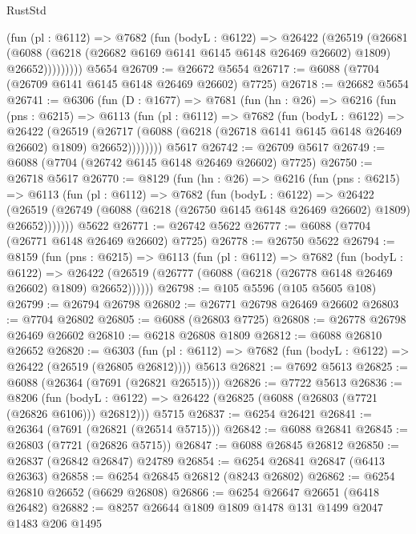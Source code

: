 \begin{lexlean}{RustStd}
\begin{coremodule}
            (fun (pl : @6112) =>
            @7682
              (fun (bodyL : @6122) =>
              @26422
                (@26519
                  (@26681
                    (@6088
                      (@6218 (@26682 @6169 @6141 @6145 @6148 @26469 @26602) @1809)
                      @26652)))))))))
    @5654
@26709 := @26672 @5654
@26717 := @6088 (@7704 (@26709 @6141 @6145 @6148 @26469 @26602) @7725)
@26718 := @26682 @5654
@26741 := @6306
    (fun (D : @1677) =>
    @7681
      (fun (hn : @26) =>
      @6216
        (fun (pns : @6215) =>
        @6113
          (fun (pl : @6112) =>
          @7682
            (fun (bodyL : @6122) =>
            @26422
              (@26519
                (@26717 (@6088 (@6218 (@26718 @6141 @6145 @6148 @26469 @26602) @1809) @26652))))))))
    @5617
@26742 := @26709 @5617
@26749 := @6088 (@7704 (@26742 @6145 @6148 @26469 @26602) @7725)
@26750 := @26718 @5617
@26770 := @8129
    (fun (hn : @26) =>
    @6216
      (fun (pns : @6215) =>
      @6113
        (fun (pl : @6112) =>
        @7682
          (fun (bodyL : @6122) =>
          @26422
            (@26519 (@26749 (@6088 (@6218 (@26750 @6145 @6148 @26469 @26602) @1809) @26652)))))))
    @5622
@26771 := @26742 @5622
@26777 := @6088 (@7704 (@26771 @6148 @26469 @26602) @7725)
@26778 := @26750 @5622
@26794 := @8159
    (fun (pns : @6215) =>
    @6113
      (fun (pl : @6112) =>
      @7682
        (fun (bodyL : @6122) =>
        @26422 (@26519 (@26777 (@6088 (@6218 (@26778 @6148 @26469 @26602) @1809) @26652))))))
@26798 := @105 @5596 (@105 @5605 @108)
@26799 := @26794 @26798
@26802 := @26771 @26798 @26469 @26602
@26803 := @7704 @26802
@26805 := @6088 (@26803 @7725)
@26808 := @26778 @26798 @26469 @26602
@26810 := @6218 @26808 @1809
@26812 := @6088 @26810 @26652
@26820 := @6303
    (fun (pl : @6112) => @7682 (fun (bodyL : @6122) => @26422 (@26519 (@26805 @26812))))
    @5613
@26821 := @7692 @5613
@26825 := @6088 (@26364 (@7691 (@26821 @26515)))
@26826 := @7722 @5613
@26836 := @8206
    (fun (bodyL : @6122) => @26422 (@26825 (@6088 (@26803 (@7721 (@26826 @6106))) @26812)))
    @5715
@26837 := @6254 @26421
@26841 := @26364 (@7691 (@26821 (@26514 @5715)))
@26842 := @6088 @26841
@26845 := @26803 (@7721 (@26826 @5715))
@26847 := @6088 @26845 @26812
@26850 := @26837 (@26842 @26847) @24789
@26854 := @6254 @26841 @26847 (@6413 @26363)
@26858 := @6254 @26845 @26812 (@8243 @26802)
@26862 := @6254 @26810 @26652 (@6629 @26808)
@26866 := @6254 @26647 @26651 (@6418 @26482)
@26882 := @8257
    @26644
    @1809
    @1809
    @1478
    @131
    @1499
    @2047
    @1483
    @206
    @1495

\end{coremodule}
\end{lexlean}
